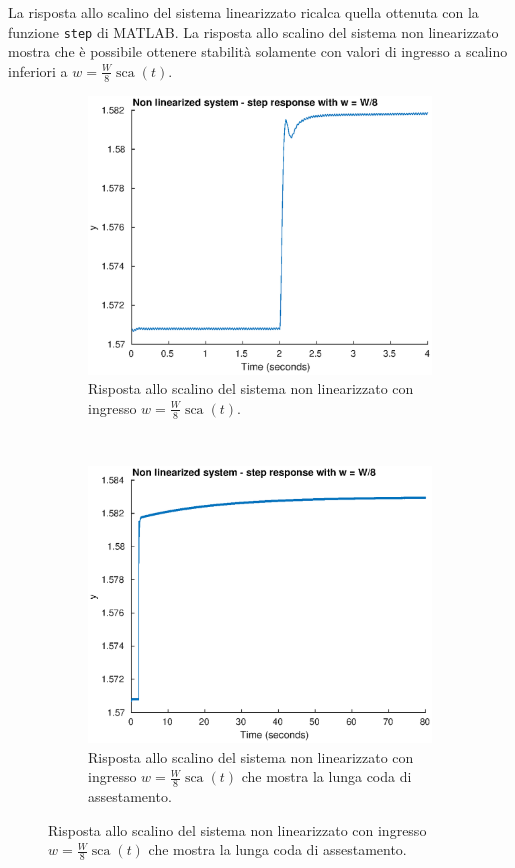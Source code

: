 \documentclass[a4paper]{article}
\DeclareMathOperator*{\sca}{\textrm{sca}}
\begin{document}
La risposta allo scalino del sistema linearizzato ricalca quella ottenuta con la funzione \texttt{step} di MATLAB.
La risposta allo scalino del sistema non linearizzato mostra che è possibile ottenere stabilità solamente con valori di ingresso a scalino inferiori a $w = \frac{W}{8} \sca(t)$. 
\begin{figure}[h!]
    \centering
\begin{subfigure}[t]{0.48\textwidth}
    \centering
    \includegraphics[width=\textwidth]{step_nonlin_short}
    \caption{Risposta allo scalino del sistema non linearizzato con ingresso $w = \frac{W}{8} \sca (t)$.}
    \label{fig:step_sim_nonlin}
\end{subfigure}
~
\begin{subfigure}[t]{0.48\textwidth}
    \centering
    \includegraphics[width=\textwidth]{step_nonlin_long}
    \caption{Risposta allo scalino del sistema non linearizzato con ingresso $w = \frac{W}{8} \sca (t)$ che mostra la lunga coda di assestamento.}
    \label{fig:step_sim_nonlin_long}
\end{subfigure}
\end{figure}
\end{document}
